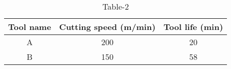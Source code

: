 \begin{table}[H]
        \centering
        \begin{tabular}{ccc}
    \hline
    Tool name & Cutting speed (m/min) & Tool life (min) \\
    \hline
    A & 200 & 20 \\
    B & 150 & 58 \\
    \hline
    \end{tabular}
        \caption{Table-2}
        \label{tab:tables/table2.tex}
    \end{table}